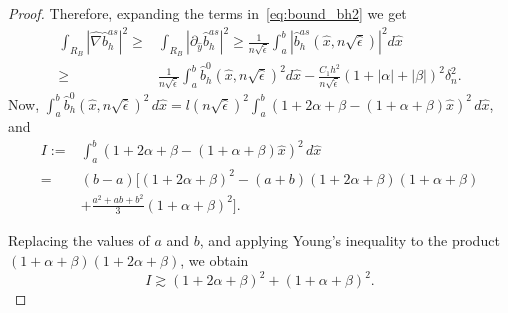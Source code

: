 \documentclass{article}
\newcommand{\yesdelete}[1]{}
\newcommand{\oab}{\ensuremath{1+\alpha+\beta}}
\newcommand{\otab}{\ensuremath{1+2\alpha+\beta}}
\newcommand{\hatb}{\ensuremath{\hat{b}}}
\newcommand{\hatx}{\ensuremath{{\hat{x}}}}
\newcommand{\haty}{\ensuremath{{\hat{y}}}}
\newcommand{\hatN}{\ensuremath{\hat{\nabla}}}
\newcommand{\hatnsep}{\ensuremath{n\sqrt{\hat{\epsilon}}}}
\begin{document}
\begin{appendix}
\begin{proof}
Therefore, expanding the terms in~\eqref{eq:bound_bh2} we get
\begin{equation}\label{crucial bound}
\begin{split}
    \int_{R_B}|\hatN \hatb_h^{as}|^2 \ge {}&
    \int_{R_B} |\partial_\haty \hatb_h^{as}|^2
    \ge\frac{1}{\hatnsep}\int_a^b |\hatb_h^{as}(\hatx,\hatnsep)|^2d\hatx 
    \\
    \ge{}& \frac{1}{\hatnsep}
    \int_a^b \hatb_h^0(\hatx,\hatnsep)^2d\hatx
    -\frac{C_1 h^2}{\hatnsep}(1+|\alpha|+|\beta|)^2\delta_n^2 .
\end{split}
\end{equation}
Now, $\int_a^b \hatb_h^0(\hatx,\hatnsep)^2 \,d\hatx 
= l(n\sqrt{\hat{\epsilon}})^2 \int_a^b (\otab - (\oab)\hatx)^2\,d\hatx$, and 
\begin{align*}
I :={}&\int_a^b (\otab - (\oab)\hatx)^2\,d\hatx
\\
={}& (b-a)
\Big[(1+2\alpha+\beta)^2-(a+b)(1+2\alpha+\beta)(1+\alpha+\beta)\\
&+\frac{a^2 +ab+b^2}{3}(1+\alpha+\beta)^2\Big]    .
\end{align*}

\yesdelete{
Using that $a=1/4$, $b=3/4$, $a+b=1$, $b-a=1/2$, and $(a^2+ab+b^2)/3=13/48$ we have
\begin{align*}
I ={}& \frac12
    \Big[(1+2\alpha+\beta)^2-(1+2\alpha+\beta)(1+\alpha+\beta)
    +\frac{13}{48}(1+\alpha+\beta)^2\Big].
\end{align*}
Young's inequality, for $\eta>0$, yields
\begin{align*}
I \ge{}& \frac12\Big[\big(1-\frac{1}{4\eta}\big)(1+2\alpha+\beta)^2
+\big(\frac{13}{48}-\eta\big)(1+\alpha+\beta)^2\Big] 
\end{align*}
We now choose $1/4 < \eta < 13/48$ so that $\frac{13}{48}-\eta > 0$ and $1-\frac1{4\eta} >0$, whence
}

Replacing the values of $a$ and 
$b$, and applying Young’s inequality to the product $(\oab)(\otab)$, we obtain
\begin{equation}\label{Ibound}
I \gtrsim  (1+2\alpha+\beta)^2
+(1+\alpha+\beta)^2 .
\end{equation}


\end{proof}
\end{appendix}
\end{document}
